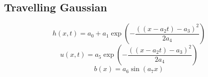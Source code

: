 \subsection{Travelling Gaussian}
\begin{equation}
h(x,t) = a_0 + a_1\exp\left(-\dfrac{ \left(\left(x - a_2t\right) - a_3 \right)^2}{2a_4}\right)
\end{equation}
\begin{equation}
u(x,t) = a_5\exp\left(-\dfrac{ \left(\left(x - a_2t\right) - a_3 \right)^2}{2a_4}\right)
\end{equation}
\begin{equation}
b(x) = a_6\sin\left(a_7 x\right)
\end{equation}












